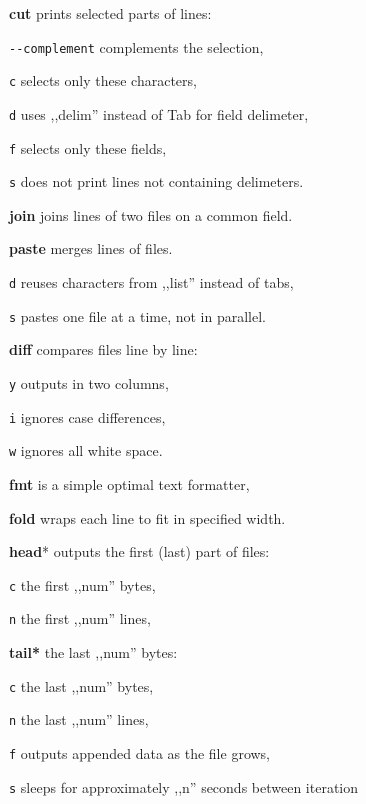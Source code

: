 \begin{enumx}
	\item [\cmdblack] \textbf{cut} prints selected parts of lines:
	\item [] \texttt{-}\texttt{-}\texttt{complement} complements the selection,
	\item [\texttt{c}] selects only these characters,
	\item [\texttt{d}] uses ,,delim'' instead of Tab for field delimeter,
	\item [\texttt{f}] selects only these fields,
	\item [\texttt{s}] does not print lines not containing delimeters.
	\item [\cmdblack] \textbf{join} joins lines of two files on a common field.
	\item [\cmdblack] \textbf{paste} merges lines of files.
	\item [\texttt{d}] reuses characters from ,,list'' instead of tabs,
	\item [\texttt{s}] pastes one file at a time, not in parallel.
\end{enumx}

\begin{enumx}
	\item [\cmd] \textbf{diff} compares files line by line:
	\item [\texttt{y}] outputs in two columns,
	\item [\texttt{i}] ignores case differences,
	\item [\texttt{w}] ignores all white space.
\end{enumx}

\begin{enumx}
	\item [\cmd] \textbf{fmt} is a simple optimal text formatter, 
	\item [\cmd] \textbf{fold} wraps each line to fit in specified width.
\end{enumx}

\begin{enumx}
	\item [\cmd] \textbf{head}* outputs the first (last) part of files:
	\item [\texttt{c}] the first ,,num'' bytes,
	\item [\texttt{n}] the first ,,num'' lines,
	\item [\cmd] \textbf{tail*} the last ,,num'' bytes:
	\item [\texttt{c}] the last ,,num'' bytes,
	\item [\texttt{n}] the last ,,num'' lines,
	\item [\texttt{f}] outputs appended data as the file grows,
	\item [\texttt{s}] sleeps for approximately ,,n'' seconds between iteration 
\end{enumx}

